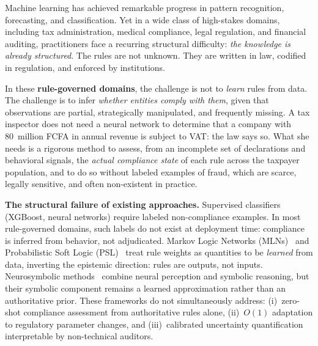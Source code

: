\documentclass[letterpaper]{article}
\begin{document}
Machine learning has achieved remarkable progress in pattern recognition,
forecasting, and classification. Yet in a wide class of high-stakes
domains, including tax administration, medical compliance, legal
regulation, and financial auditing, practitioners face a recurring
structural difficulty: \emph{the knowledge is already structured}. The
rules are not unknown. They are written in law, codified in regulation,
and enforced by institutions.

In these \textbf{rule-governed domains}, the challenge is not to
\emph{learn} rules from data. The challenge is to infer \emph{whether
entities comply with them}, given that observations are partial,
strategically manipulated, and frequently missing. A tax inspector does
not need a neural network to determine that a company with 80~million
FCFA in annual revenue is subject to VAT: the law says so. What she
needs is a rigorous method to assess, from an incomplete set of
declarations and behavioral signals, the \emph{actual compliance state}
of each rule across the taxpayer population, and to do so without
labeled examples of fraud, which are scarce, legally sensitive, and
often non-existent in practice.

\medskip
\noindent\textbf{The structural failure of existing approaches.}
Supervised classifiers (XGBoost, neural networks) require labeled
non-compliance examples. In most rule-governed domains, such labels
do not exist at deployment time: compliance is inferred from behavior,
not adjudicated. Markov Logic Networks (MLNs)~\citep{richardson2006markov}
and Probabilistic Soft Logic (PSL)~\citep{bach2017hinge} treat rule
weights as quantities to be \emph{learned} from data, inverting the
epistemic direction: rules are outputs, not inputs. Neurosymbolic
methods~\citep{garcez2022neural} combine neural perception and symbolic
reasoning, but their symbolic component remains a learned approximation
rather than an authoritative prior. These frameworks do not
simultaneously address: (i)~zero-shot compliance assessment from
authoritative rules alone, (ii)~$O(1)$ adaptation to regulatory
parameter changes, and (iii)~calibrated uncertainty quantification
interpretable by non-technical auditors.
\end{document}
